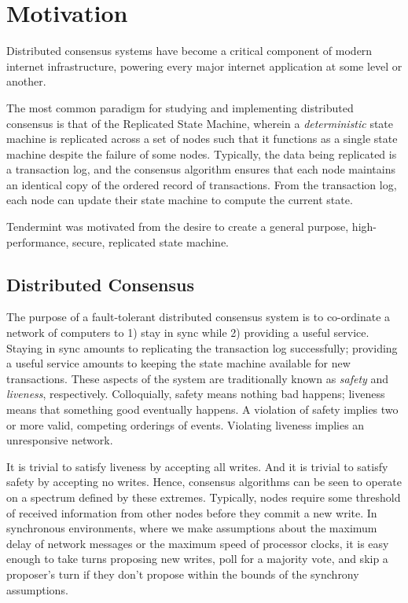 \chapter{Motivation}
\label{ch:motivation}

Distributed consensus systems have become a critical component of modern internet infrastructure, powering every major internet application at some level or another.

The most common paradigm for studying and implementing distributed consensus is that of the Replicated State Machine, 
wherein a \emph{deterministic} state machine is replicated across a set of nodes such that it functions as a single state machine despite the failure of some nodes.
Typically, the data being replicated is a transaction log, and the consensus algorithm ensures that each node maintains an identical copy of 
the ordered record of transactions.
From the transaction log, each node can update their state machine to compute the current state.

Tendermint was motivated from the desire to create a general purpose, high-performance, secure, replicated state machine.


\section{Distributed Consensus}

The purpose of a fault-tolerant distributed consensus system is to co-ordinate a network of computers to 1) stay in sync while 2) providing a useful service.
Staying in sync amounts to replicating the transaction log successfully; providing a useful service amounts to keeping the state machine available for new transactions.
These aspects of the system are traditionally known as \emph{safety} and \emph{liveness}, respectively.
Colloquially, safety means nothing bad happens; liveness means that something good eventually happens.
A violation of safety implies two or more valid, competing orderings of events.
Violating liveness implies an unresponsive network.

It is trivial to satisfy liveness by accepting all writes. And it is trivial to satisfy safety by accepting no writes.
Hence, consensus algorithms can be seen to operate on a spectrum defined by these extremes.
Typically, nodes require some threshold of received information from other nodes before they commit a new write.
In synchronous environments, where we make assumptions about the maximum delay of network messages or the maximum speed of processor clocks,
 it is easy enough to take turns proposing new writes, poll for a majority vote, 
and skip a proposer's turn if they don't propose within the bounds of the synchrony assumptions.

